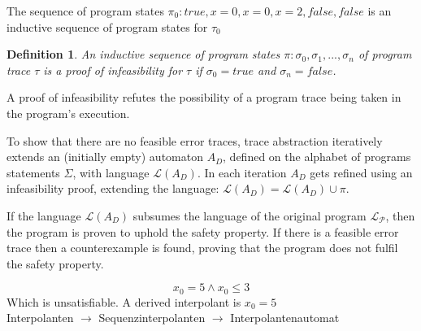\documentclass{article}
\newcounter{example}[section]
\newtheorem{mydef}{Definition}
\newcommand\mycom[1]{}
\newcommand\mycom[1]{#1}
\newcommand{\jw}[1]{\mycom{\todo[color=blue!40,inline]{\small JW: #1}}}
\newcommand{\dd}[1]{\mycom{\todo[color=orange!40,inline]{\small DD: #1}}}
\begin{document}
\dd{$true$ is not a program state!}
The sequence of program states $\pi_0: true, x = 0, x = 0, x = 2, false, false$ is an inductive sequence of program states for $\tau_0$

\begin{mydef}
	An inductive sequence  of program states $\pi: \sigma_0, \sigma_1,..., \sigma_n$ of program trace $\tau$ is a proof of infeasibility for $\tau$ if $\sigma_0 = true$ and $\sigma_n = false$.
\end{mydef}
A proof of infeasibility refutes the possibility of a program trace being taken in the program's execution.

To show that there are no feasible error traces, trace abstraction iteratively extends an (initially empty) automaton $A_D$, defined on the alphabet of programs statements $\Sigma$, with language $\mathcal{L}(A_D)$.
In each iteration $A_D$ gets refined using an infeasibility proof, extending the language: $\mathcal{L}(A_D) = \mathcal{L}(A_D) \cup \pi$.
\dd{No, not with $\pi$. Perhaps with $\{\tau\}$. Also, write it as update $:=$.}
If the language $\mathcal{L}(A_D)$ subsumes the language of the original program $\mathcal{L_P}$, then the program is proven to uphold the safety property.
If there is a feasible error trace then a counterexample is found, proving that the program does not fulfil the safety property.

\jw{TODO}

\begin{equation}
	x_0 = 5 \land x_0 \leq 3
\end{equation}
Which is unsatisfiable. A derived interpolant is $x_0 = 5$ \\
Interpolanten $\rightarrow$ Sequenzinterpolanten \cite{10.1007/11691372_33} $\rightarrow$ Interpolantenautomat
\dd{Even if this is todo, the example is not really helpful for an interpolant. And, if you want to be complete, you could add the definition of (binary or sequence) interpolants}
\end{document}
